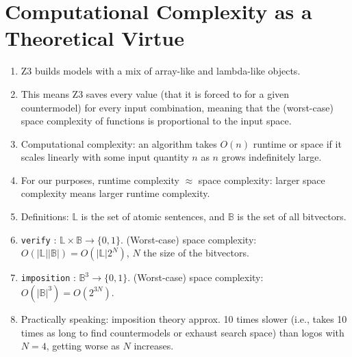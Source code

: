 \documentclass[a4paper, 11pt]{article} %
\theoremstyle{Pthm}
\newcommand{\set}[1]{\lbrace#1\rbrace} %
\newcommand{\abs}[1]{|#1|} %
\begin{document}
\section*{Computational Complexity as a Theoretical Virtue}%

\begin{enumerate}[leftmargin=.25in]
	\item Z3 builds models with a mix of array-like and lambda-like objects.
	\item This means Z3 saves every value (that it is forced to for a given countermodel) for every input combination, meaning that the (worst-case) space complexity of functions is proportional to the input space. 
	\item Computational complexity: an algorithm takes $O(n)$ runtime or space if it scales linearly with some input quantity $n$ as $n$ grows indefinitely large. 
	\item For our purposes, runtime complexity $\approx$ space complexity: larger space complexity means larger runtime complexity. 
	\item Definitions: $\mathbb{L}$ is the set of atomic sentences, and $\mathbb{B}$ is the set of all bitvectors. 
	\item \texttt{verify} : $\mathbb{L} \times \mathbb{B} \to \set{0,1}$. (Worst-case) space complexity: $O(\abs{\mathbb{L}} \abs{\mathbb{B}}) = O(\abs{\mathbb{L}} 2^N)$, $N$ the size of the bitvectors.
	\item \texttt{imposition} : $\mathbb{B}^3 \to \set{0,1}$. (Worst-case) space complexity: $O(\abs{\mathbb{B}}^3) = O(2^{3N})$.
	\item Practically speaking: imposition theory approx. 10 times slower (i.e., takes 10 times as long to find countermodels or exhaust search space) than logos with $N=4$, getting worse as $N$ increases. 

\end{enumerate}
\end{document}
